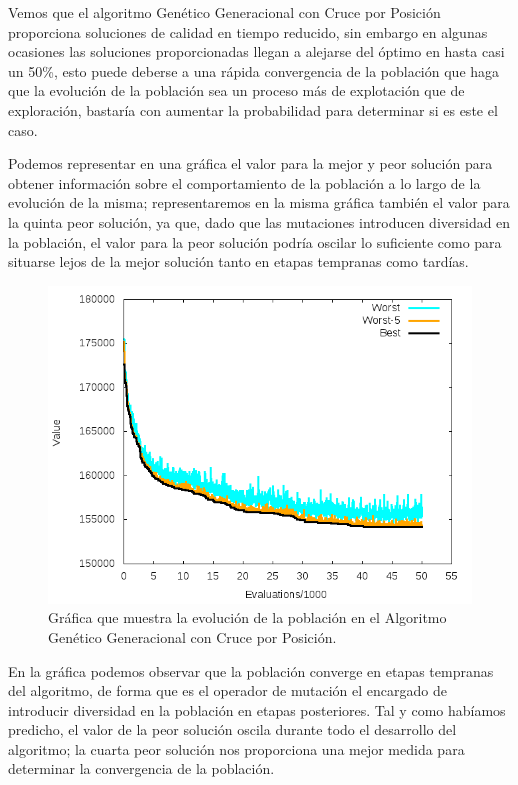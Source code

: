 \documentclass[11pt,a4paper]{article}
\begin{document}
		\noindent Vemos que el algoritmo Genético Generacional con Cruce por Posición proporciona soluciones de calidad en tiempo reducido, sin embargo en algunas ocasiones las soluciones proporcionadas llegan a alejarse del óptimo en hasta casi un 50\%, esto puede deberse a una rápida convergencia de la población que haga que la evolución de la población sea un proceso más de explotación que de exploración, bastaría con aumentar la probabilidad para determinar si es este el caso.
	
		\noindent Podemos representar en una gráfica el valor para la mejor y peor solución para obtener información sobre el comportamiento de la población a lo largo de la evolución de la misma; representaremos en la misma gráfica también el valor para la quinta peor solución, ya que, dado que las mutaciones introducen diversidad en la población, el valor para la peor solución podría oscilar lo suficiente como para situarse lejos de la mejor solución tanto en etapas tempranas como tardías.
		
		\begin{figure}[!h]
			\centering
			\includegraphics[scale=0.4]{Plots/AGGPos.png} 
			\caption{Gráfica que muestra la evolución de la población en el Algoritmo Genético Generacional con Cruce por Posición.} \label{fig:figura2}
		\end{figure} 
		
		\newpage
		
		\noindent En la gráfica podemos observar que la población converge en etapas tempranas del algoritmo, de forma que es el operador de mutación el encargado de introducir diversidad en la población en etapas posteriores. Tal y como habíamos predicho, el valor de la peor solución oscila durante todo el desarrollo del algoritmo; la cuarta peor solución nos proporciona una mejor medida para determinar la convergencia de la población.
	
\end{document}
